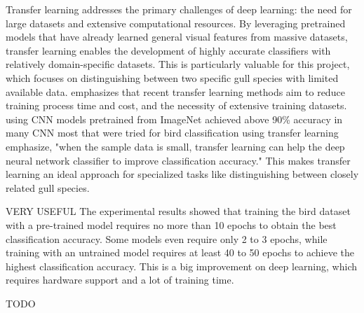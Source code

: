 \documentclass[a4paper,12pt]{report}
\begin{document}

Transfer learning addresses the primary challenges of deep learning: the need for large datasets and extensive computational resources. By leveraging pretrained models that have already learned general visual features from massive datasets, transfer learning enables the development of highly accurate classifiers with relatively domain-specific datasets. This is particularly valuable for this project, which focuses on distinguishing between two specific gull species with limited available data. \citep{Iman_2023} emphasizes that recent transfer learning methods aim to reduce training process time and cost, and the necessity of extensive training datasets. \citep{transferln97} using CNN models pretrained from ImageNet achieved above 90\% accuracy in many CNN most that were tried for bird classification using transfer learning emphasize, "when the sample data is small, transfer learning can help the deep neural network classifier to improve classification accuracy." This makes transfer learning an ideal approach for specialized tasks like distinguishing between closely related gull species.


VERY USEFUL
The experimental results showed that training the bird dataset with a pre-trained model requires no more than
10 epochs to obtain the best classification accuracy. Some models even require only 2 to 3 epochs, while
training with an untrained model requires at least 40 to 50 epochs to achieve the highest classification
accuracy. This is a big improvement on deep learning, which requires hardware support and a lot of training
time.


TODO \citep{kornblith2019better} 


\end{document}
